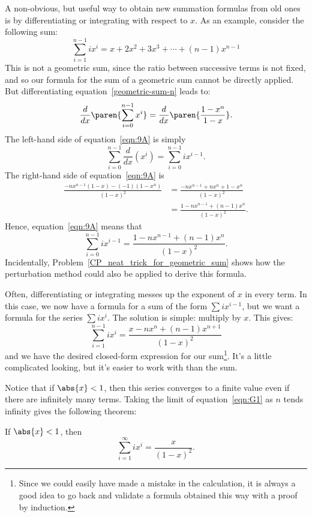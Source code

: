 A non-obvious, but useful way to obtain new summation formulas from
old ones is by differentiating or integrating with respect to $x$.  As
an example, consider the following sum:
\[
\sum_{i=1}^{n-1} i x^i = x + 2 x^2 + 3 x^3 + \cdots + (n - 1) x^{n -
  1}
\]
This is not a geometric sum, since the ratio between successive terms
is not fixed, and so our formula for the sum of a geometric sum cannot
be directly applied.  But differentiating
equation~\ref{geometric-sum-n} leads
to:
\begin{equation}\label{eqn:9A}
\frac{d}{dx} \paren{ \sum_{i = 0}^{n - 1} x^i }
   = \frac{d}{dx} \paren{ \frac{1 - x^n}{1 - x} }.
\end{equation}
The left-hand side of equation~\ref{eqn:9A} is simply
\[
\sum_{i = 0}^{n - 1} \frac{d}{dx} (x^i)
    = \sum_{i = 0}^{n - 1} i x^{i - 1}.
\]
The right-hand side of equation~\ref{eqn:9A} is
\begin{align*}
\frac{ -n x^{n - 1} (1 - x) - (-1) (1 - x^n) }{ (1 - x)^2 }
    &= \frac{ -n x^{n - 1} + n x^n + 1 - x^n }{ (1 - x)^2 } \\
    &= \frac{1 - n x^{n - 1} + (n - 1) x^n}{ (1 - x)^2 }.
\end{align*}
Hence, equation~\ref{eqn:9A} means that
\[
\sum_{i = 0}^{n - 1} i x^{i - 1}
    = \frac{1 - n x^{n - 1} + (n - 1) x^n}{ (1 - x)^2 }.
\]
Incidentally, Problem~\ref{CP_neat_trick_for_geometric_sum} shows how
the perturbation method could also be applied to derive this formula.

Often, differentiating or integrating messes up the exponent of $x$ in
every term.  In this case, we now have a formula for a sum of the form
$\sum i x^{i-1}$, but we want a formula for the series $\sum i x^i$.
The solution is simple: multiply by $x$.  This gives:
\begin{equation}\label{eqn:G1}
    \sum_{i=1}^{n - 1} i x^i = \frac{ x - n x^n + (n - 1) x^{n+1}}{(1 - x)^2}
\end{equation}
and we have the desired closed-form expression for our
sum\footnote{Since we could easily have made a mistake in the
  calculation, it is always a good idea to go back and validate a
  formula obtained this way with a proof by induction.}.  It's a
little complicated looking, but it's easier to work with than the sum.

Notice that if $\abs{x} < 1$, then this series converges to a finite
value even if there are infinitely many terms.  Taking the limit of
equation~\ref{eqn:G1} as $n$ tends infinity gives the following
theorem:
\begin{theorem}\label{th:inf_ixi}
If $\abs{x} < 1$, then
\[
    \sum_{i=1}^\infty i x^i = \frac{x}{(1-x)^2}.
\]
\end{theorem}

